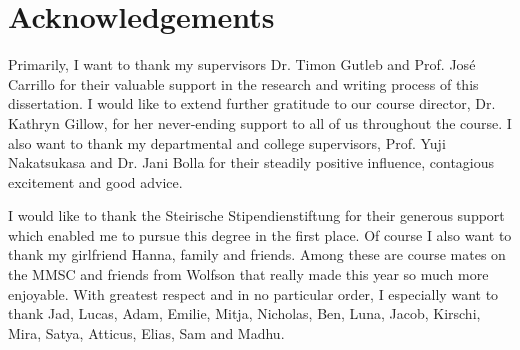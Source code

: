 \chapter*{Acknowledgements}

Primarily, I want to thank my supervisors Dr. Timon Gutleb and Prof. José Carrillo for their valuable support in the research and writing process of this dissertation.
I would like to extend further gratitude to our course director, Dr. Kathryn Gillow, for her never-ending support to all of us throughout the course.
I also want to thank my departmental and college supervisors, Prof. Yuji Nakatsukasa and Dr. Jani Bolla for their steadily positive influence, contagious excitement and good advice.

I would like to thank the Steirische Stipendienstiftung for their generous support which enabled me to pursue this degree in the first place.
Of course I also want to thank my girlfriend Hanna, family and friends.
Among these are course mates on the MMSC and friends from Wolfson that really made this year so much more enjoyable.
With greatest respect and in no particular order, I especially want to thank Jad, Lucas, Adam, Emilie, Mitja, Nicholas, Ben, Luna, Jacob, Kirschi, Mira, Satya, Atticus, Elias, Sam and Madhu.


